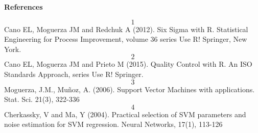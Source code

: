 \documentclass[11pt, a4paper]{article}
\begin{document}
\textbf{References}

\[1\] Cano EL, Moguerza JM and Redchuk A (2012). Six Sigma with R.
Statistical Engineering for Process Improvement, volume 36 series Use R!
Springer, New York. \[2\] Cano EL, Moguerza JM and Prieto M (2015).
Quality Control with R. An ISO Standards Approach, series Use R!
Springer. \[3\] Moguerza, J.M., Muñoz, A. (2006). Support Vector
Machines with applications. Stat. Sci. 21(3), 322-336 \[4\] Cherkassky,
V and Ma, Y (2004). Practical selection of SVM parameters and noise
estimation for SVM regression. Neural Networks, 17(1), 113-126
\end{document}
